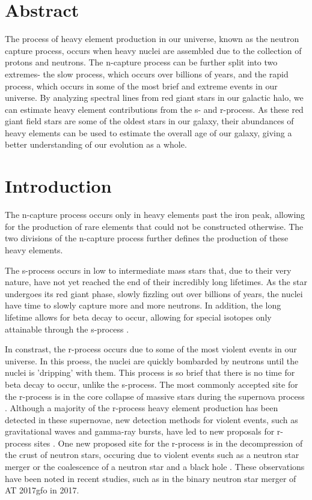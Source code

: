 \section{Abstract}

The process of heavy element production in our universe, known as the neutron capture process, occurs when heavy nuclei are assembled due to the collection of protons and neutrons. The n-capture process can be further split into two extremes- the slow process, which occurs over billions of years, and the rapid process, which occurs in some of the most brief and extreme events in our universe. By analyzing spectral lines from red giant stars in our galactic halo, we can estimate heavy element contributions from the s- and r-process. As these red giant field stars are some of the oldest stars in our galaxy, their abundances of heavy elements can be used to estimate the overall age of our galaxy, giving a better understanding of our evolution as a whole.

\section{Introduction}

The n-capture process occurs only in heavy elements past the iron peak, allowing for the production of rare elements that could not be constructed otherwise. The two divisions of the n-capture process further defines the production of these heavy elements.

The s-process occurs in low to intermediate mass stars that, due to their very nature, have not yet reached the end of their incredibly long lifetimes. As the star undergoes its red giant phase, slowly fizzling out over billions of years, the nuclei have time to slowly capture more and more neutrons. In addition, the long lifetime allows for beta decay to occur, allowing for special isotopes only attainable through the s-process \cite{ncs99}.

In constrast, the r-process occurs due to some of the most violent events in our universe. In this proess, the nuclei are quickly bombarded by neutrons until the nuclei is 'dripping' with them. This process is so brief that there is no time for beta decay to occur, unlike the s-process. The most commonly accepted site for the r-process is in the core collapse of massive stars during the supernova process \cite{ncs02}. Although a majority of the r-process heavy element production has been detected in these supernovae, new detection methods for violent events, such as gravitational waves and gamma-ray bursts, have led to new proposals for r-process sites \cite{mmo17}. One new proposed site for the r-process is in the decompression of the crust of neutron stars, occuring due to violent events such as a neutron star merger or the coalescence of a neutron star and a black hole \cite{rpro07}. These observations have been noted in recent studies, such as in the binary neutron star merger of AT 2017gfo in 2017.

